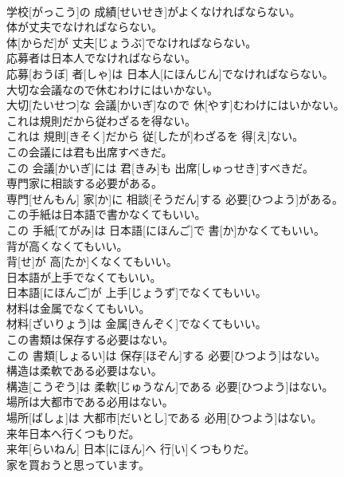\documentclass[8pt]{extreport}
\begin{document}
\begin{CJK}{UTF8}{min}
\\	学校[がっこう]の 成績[せいせき]がよくなければならない。
\\	体が丈夫でなければならない。	
\\	体[からだ]が 丈夫[じょうぶ]でなければならない。
\\	応募者は日本人でなければならない。	
\\	応募[おうぼ] 者[しゃ]は 日本人[にほんじん]でなければならない。
\\	大切な会議なので休むわけにはいかない。	
\\	大切[たいせつ]な 会議[かいぎ]なので 休[やす]むわけにはいかない。
\\	これは規則だから従わざるを得ない。	
\\	これは 規則[きそく]だから 従[したが]わざるを 得[え]ない。
\\	この会議には君も出席すべきだ。	
\\	この 会議[かいぎ]には 君[きみ]も 出席[しゅっせき]すべきだ。
\\	専門家に相談する必要がある。	
\\	専門[せんもん] 家[か]に 相談[そうだん]する 必要[ひつよう]がある。
\\	この手紙は日本語で書かなくてもいい。	
\\	この 手紙[てがみ]は 日本語[にほんご]で 書[か]かなくてもいい。
\\	背が高くなくてもいい。	
\\	背[せ]が 高[たか]くなくてもいい。
\\	日本語が上手でなくてもいい。	
\\	日本語[にほんご]が 上手[じょうず]でなくてもいい。
\\	材料は金属でなくてもいい。	
\\	材料[ざいりょう]は 金属[きんぞく]でなくてもいい。
\\	この書類は保存する必要はない。	
\\	この 書類[しょるい]は 保存[ほぞん]する 必要[ひつよう]はない。
\\	構造は柔軟である必要はない。	
\\	構造[こうぞう]は 柔軟[じゅうなん]である 必要[ひつよう]はない。
\\	場所は大都市である必用はない。	
\\	場所[ばしょ]は 大都市[だいとし]である 必用[ひつよう]はない。
\\	来年日本へ行くつもりだ。	
\\	来年[らいねん] 日本[にほん]へ 行[い]くつもりだ。
\\	家を買おうと思っています。	

\end{CJK}
\end{document}
